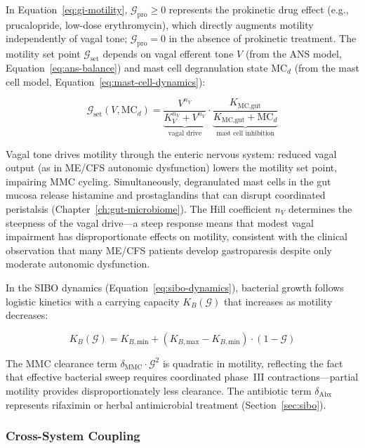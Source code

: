 In Equation~\ref{eq:gi-motility}, $\mathcal{G}_{\text{pro}} \geq 0$ represents the prokinetic drug effect (e.g., prucalopride, low-dose erythromycin), which directly augments motility independently of vagal tone; $\mathcal{G}_{\text{pro}} = 0$ in the absence of prokinetic treatment. The motility set point $\mathcal{G}_{\text{set}}$ depends on vagal efferent tone $V$ (from the ANS model, Equation~\ref{eq:ans-balance}) and mast cell degranulation state $\text{MC}_d$ (from the mast cell model, Equation~\ref{eq:mast-cell-dynamics}):

\begin{equation}
\label{eq:motility-setpoint}
\mathcal{G}_{\text{set}}(V, \text{MC}_d) = \underbrace{\frac{V^{n_V}}{K_V^{n_V} + V^{n_V}}}_{\text{vagal drive}} \cdot \underbrace{\frac{K_{\text{MC,gut}}}{K_{\text{MC,gut}} + \text{MC}_d}}_{\text{mast cell inhibition}}
\end{equation}

Vagal tone drives motility through the enteric nervous system: reduced vagal output (as in ME/CFS autonomic dysfunction) lowers the motility set point, impairing MMC cycling. Simultaneously, degranulated mast cells in the gut mucosa release histamine and prostaglandins that can disrupt coordinated peristalsis (Chapter~\ref{ch:gut-microbiome}). The Hill coefficient $n_V$ determines the steepness of the vagal drive---a steep response means that modest vagal impairment has disproportionate effects on motility, consistent with the clinical observation that many ME/CFS patients develop gastroparesis despite only moderate autonomic dysfunction.

In the SIBO dynamics (Equation~\ref{eq:sibo-dynamics}), bacterial growth follows logistic kinetics with a carrying capacity $K_B(\mathcal{G})$ that increases as motility decreases:

\begin{equation}
\label{eq:sibo-carrying-capacity}
K_B(\mathcal{G}) = K_{B,\text{min}} + (K_{B,\text{max}} - K_{B,\text{min}}) \cdot (1 - \mathcal{G})
\end{equation}

The MMC clearance term $\delta_{\text{MMC}} \cdot \mathcal{G}^2$ is quadratic in motility, reflecting the fact that effective bacterial sweep requires coordinated phase~III contractions---partial motility provides disproportionately less clearance. The antibiotic term $\delta_{\text{Abx}}$ represents rifaximin or herbal antimicrobial treatment (Section~\ref{sec:sibo}).

\subsubsection{Cross-System Coupling}

